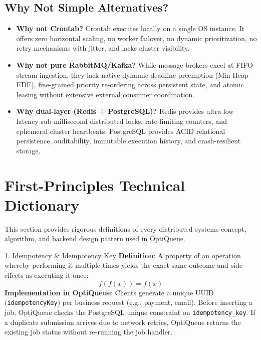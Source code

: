 \documentclass[11pt,a4paper]{article}
\begin{document}
\subsection{Why Not Simple Alternatives?}
\begin{itemize}[leftmargin=1.5em]
    \item \textbf{Why not Crontab?} Crontab executes locally on a single OS instance. It offers zero horizontal scaling, no worker failover, no dynamic prioritization, no retry mechanisms with jitter, and lacks cluster visibility.
    \item \textbf{Why not pure RabbitMQ/Kafka?} While message brokers excel at FIFO stream ingestion, they lack native dynamic deadline preemption (Min-Heap EDF), fine-grained priority re-ordering across persistent state, and atomic leasing without extensive external consumer coordination.
    \item \textbf{Why dual-layer (Redis + PostgreSQL)?} Redis provides ultra-low latency sub-millisecond distributed locks, rate-limiting counters, and ephemeral cluster heartbeats. PostgreSQL provides ACID relational persistence, auditability, immutable execution history, and crash-resilient storage.
\end{itemize}

\newpage
\section{First-Principles Technical Dictionary}
\label{sec:dictionary}
This section provides rigorous definitions of every distributed systems concept, algorithm, and backend design pattern used in OptiQueue.

\begin{conceptbox}{1. Idempotency \& Idempotency Key}
\textbf{Definition}: A property of an operation whereby performing it multiple times yields the exact same outcome and side-effects as executing it once:
\[ f(f(x)) = f(x) \]
\textbf{Implementation in OptiQueue}: Clients generate a unique UUID (\texttt{idempotencyKey}) per business request (e.g., payment, email). Before inserting a job, OptiQueue checks the PostgreSQL unique constraint on \texttt{idempotency\_key}. If a duplicate submission arrives due to network retries, OptiQueue returns the existing job status without re-running the job handler.
\end{conceptbox}
\end{document}
